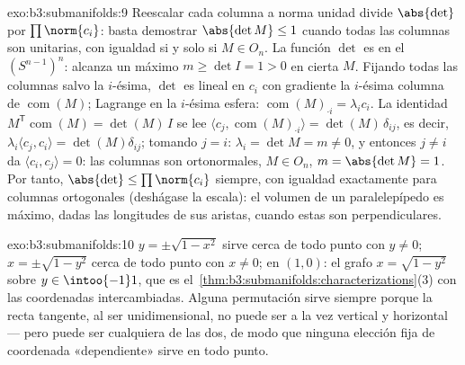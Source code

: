 \begin{solution}{exo:b3:submanifolds:9}
Reescalar cada columna a norma unidad divide $\abs{\det}$ por
$\prod\norm{c_i}$: basta demostrar $\abs{\det M} \leq 1$ cuando todas
las columnas son unitarias, con igualdad si y solo si $M \in O_n$. La
función $\det$ es  en el
 $(S^{n-1})^n$: alcanza un
máximo $m \geq \det I = 1 > 0$ en cierta $M$. Fijando todas las columnas
salvo la $i$-ésima, $\det$ es lineal en $c_i$ con gradiente la $i$-ésima
columna de $\operatorname{com}(M)$; Lagrange en la $i$-ésima esfera:
$\operatorname{com}(M)_{\cdot i} = \lambda_i c_i$. La identidad
$M^{\mathsf T}\operatorname{com}(M) = \det(M)\,I$ se lee
$\langle c_j, \operatorname{com}(M)_{\cdot i}\rangle =
\det(M)\,\delta_{ij}$, es decir, $\lambda_i\langle c_j,
c_i\rangle = \det(M)\delta_{ij}$; tomando $j = i$: $\lambda_i
= \det M = m \neq 0$, y entonces $j \neq i$ da $\langle c_i,
c_j\rangle = 0$: las columnas son ortonormales, $M \in O_n$,
$m = \abs{\det M} = 1$. Por tanto, $\abs{\det} \leq
\prod\norm{c_i}$ siempre, con igualdad exactamente para columnas
ortogonales (deshágase la escala): el volumen de un paralelepípedo es
máximo, dadas las longitudes de sus aristas, cuando estas son
perpendiculares.
\end{solution}

\begin{solution}{exo:b3:submanifolds:10}
$y = \pm\sqrt{1 - x^2}$ sirve cerca de todo punto con $y \neq
0$; $x = \pm\sqrt{1 - y^2}$ cerca de todo punto con $x \neq 0$; en
$(1, 0)$: el grafo $x = \sqrt{1 - y^2}$ sobre $y \in
\intoo{-1}1$, que es el~\cref{thm:b3:submanifolds:characterizations}(3)
con las coordenadas intercambiadas. Alguna permutación sirve siempre
porque la recta tangente, al ser unidimensional, no puede ser a la vez
vertical y horizontal --- pero puede ser cualquiera de las dos, de modo
que ninguna elección fija de coordenada «dependiente» sirve en todo
punto.
\end{solution}

